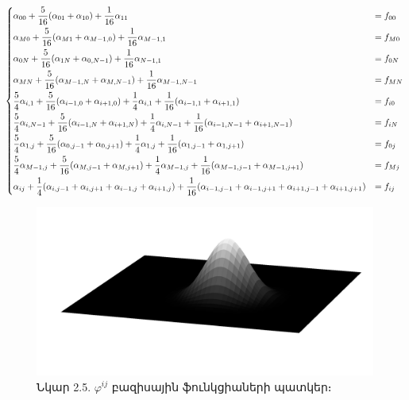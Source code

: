 \documentclass[fleqn, bachelor,subf,12pt,notitlepage]{article}
\begin{document}
\begin{equation}
\begin{dcases}
\alpha_{00}+\frac{5}{16}(\alpha_{01} + \alpha_{10}) +\frac{1}{16}\alpha_{11} &= f_{00}\\
\alpha_{M0}+\frac{5}{16}(\alpha_{M1} + \alpha_{M-1,0}) +\frac{1}{16}\alpha_{M-1, 1} &= f_{M0}\\
\alpha_{0N}+\frac{5}{16}(\alpha_{1N} + \alpha_{0,N-1}) +\frac{1}{16}\alpha_{N-1, 1} &= f_{0N}\\
\alpha_{MN}+\frac{5}{16}(\alpha_{M-1,N} + \alpha_{M,N-1}) +\frac{1}{16}\alpha_{M-1,N-1} &= f_{MN}\\
\frac{5}{4}\alpha_{i,1}+\frac{5}{16}(\alpha_{i-1,0} + \alpha_{i+1,0}) +\frac{1}{4}\alpha_{i,1} + \frac{1}{16}(\alpha_{i-1,1}+\alpha_{i+1,1}) &= f_{i0}\\
\frac{5}{4}\alpha_{i,N-1}+\frac{5}{16}(\alpha_{i-1,N} + \alpha_{i+1,N}) +\frac{1}{4}\alpha_{i,N-1} + \frac{1}{16}(\alpha_{i-1,N-1}+\alpha_{i+1,N-1}) &= f_{iN}\\
\frac{5}{4}\alpha_{1,j}+\frac{5}{16}(\alpha_{0,j-1} + \alpha_{0,j+1}) +\frac{1}{4}\alpha_{1,j} + \frac{1}{16}(\alpha_{1,j-1}+\alpha_{1,j+1}) &= f_{0j}\\
\frac{5}{4}\alpha_{M-1,j}+\frac{5}{16}(\alpha_{M,j-1} + \alpha_{M,j+1}) +\frac{1}{4}\alpha_{M-1,j} + \frac{1}{16}(\alpha_{M-1,j-1}+\alpha_{M-1,j+1})& = f_{Mj}\\
\alpha_{ij} + \frac{1}{4}(\alpha_{i,j-1} + \alpha_{i,j+1} + \alpha_{i-1,j} + \alpha_{i+1,j}) + \frac{1}{16}(\alpha_{i-1,j-1} + \alpha_{i-1,j+1} + \alpha_{i+1,j-1} +\alpha_{i+1,j+1}) &= f_{ij}
\end{dcases}
\end{equation}
\newpage
\begin{figure}[h!]
\centering
\includegraphics[width=1.0\textwidth]{images/two_dimensional_basis}
\captionsetup{labelformat=empty}
\caption{\hfill Նկար 2.5. $\varphi^{ij}$ բազիսային ֆունկցիաների պատկեր։}
\end{figure}
\end{document}
